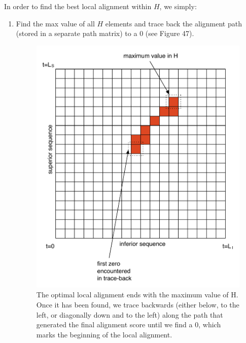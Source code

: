 \documentclass[12pt]{report} 	%
\numberwithin{figure}{chapter}
\numberwithin{table}{chapter}
\numberwithin{equation}{chapter}
\begin{document}
\begin{flushleft}
In order to find the best local alignment within $H$, we simply:
\begin{enumerate}
\item Find the max value of all $H$ elements and trace back the alignment path (stored in a separate path matrix) to a $0$ (see Figure 47).
\begin{figure}[h!]
\begin{center}
\includegraphics[scale=0.75]{SIC-DPLA_1}
\caption[Finding the optimal subsequence]{The optimal local alignment ends with the maximum value of H. Once it has been found, we trace backwards (either below, to the left, or diagonally down and to the left) along the path that generated the final alignment score until we find a $0$, which marks the beginning of the local alignment.}
\end{center}
\vspace{6pt}
\end{figure}


\end{enumerate}
\end{flushleft}
\end{document}
